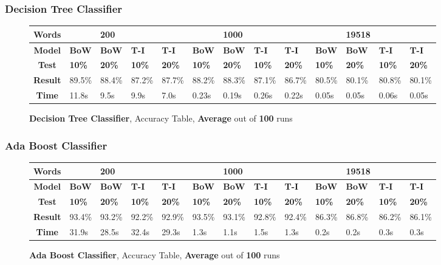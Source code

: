 \documentclass{article}
\begin{document}
	\subsubsection{Decision Tree Classifier}
	\begin{figure}[!h]
		\begin{tabular}{||c||l|l|l|l||l|l|l|l||l|l|l|l||}
			\hline
			\textbf{Words} &  & \textbf{200} & & & &\textbf{1000} & & & & \textbf{19518} &  & \\ \hline 
			\textbf{Model} & \textbf{BoW} & \textbf{BoW} & \textbf{T-I} & \textbf{T-I} &\textbf{BoW} & \textbf{BoW} & \textbf{T-I} & \textbf{T-I} & \textbf{BoW} & \textbf{BoW} & \textbf{T-I} & \textbf{T-I}\\ \hline
			\textbf{Test} & \textbf{10\%} & \textbf{20\%} & \textbf{10\%} & \textbf{20\%} & \textbf{10\%} & \textbf{20\%} & \textbf{10\%} & \textbf{20\%} & \textbf{10\%} & \textbf{20\%} & \textbf{10\%} & \textbf{20\%} \\ \hline \hline  
			\textbf{Result} & 89.5\% & 88.4\% & 87.2\% & 87.7\% & 88.2\% & 88.3\% & 87.1\% & 86.7\% & 80.5\% & 80.1\% & 80.8\% & 80.1\% \\ \hline 
			\textbf{Time} &11.8s & 9.5s & 9.9s & 7.0s & 0.23s & 0.19s & 0.26s & 0.22s & 0.05s & 0.05s & 0.06s & 0.05s \\ \hline 
		\end{tabular}
		\caption{\textbf{Decision Tree Classifier}, Accuracy Table, \textbf{Average} out of \textbf{100} runs}
	\end{figure}
	
			\subsubsection{Ada Boost Classifier}
	\begin{figure}[!h]
		\begin{tabular}{||c||l|l|l|l||l|l|l|l||l|l|l|l||}
			\hline
			\textbf{Words} &  & \textbf{200} & & & &\textbf{1000} & & & & \textbf{19518} &  & \\ \hline 
			\textbf{Model} & \textbf{BoW} & \textbf{BoW} & \textbf{T-I} & \textbf{T-I} &\textbf{BoW} & \textbf{BoW} & \textbf{T-I} & \textbf{T-I} & \textbf{BoW} & \textbf{BoW} & \textbf{T-I} & \textbf{T-I}\\ \hline
			\textbf{Test} & \textbf{10\%} & \textbf{20\%} & \textbf{10\%} & \textbf{20\%} & \textbf{10\%} & \textbf{20\%} & \textbf{10\%} & \textbf{20\%} & \textbf{10\%} & \textbf{20\%} & \textbf{10\%} & \textbf{20\%} \\ \hline \hline  
			\textbf{Result} & 93.4\% & 93.2\% & 92.2\% & 92.9\% & 93.5\% & 93.1\% & 92.8\% & 92.4\% & 86.3\% & 86.8\% & 86.2\% & 86.1\% \\ \hline 
			\textbf{Time} &31.9s & 28.5s & 32.4s & 29.3s & 1.3s & 1.1s & 1.5s & 1.3s & 0.2s & 0.2s & 0.3s & 0.3s \\ \hline 
		\end{tabular}
		\caption{\textbf{Ada Boost Classifier}, Accuracy Table, \textbf{Average} out of \textbf{100} runs}
	\end{figure}
\end{document}
